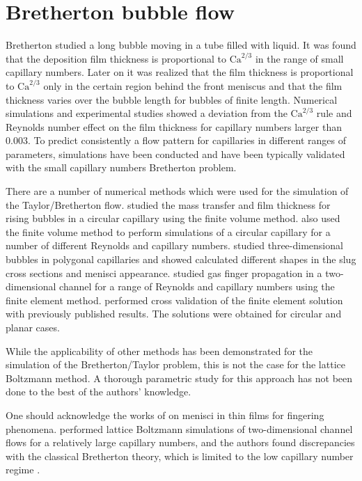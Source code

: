 \documentclass[preprint,12pt]{elsarticle}
\newcommand{\Ca}{\mathrm{Ca}}
\begin{document}
\section{Bretherton bubble flow}
Bretherton \cite{bretherton} studied a long bubble
moving in a tube filled with liquid. It was found that the deposition film thickness
is proportional to $\Ca^{2/3}$ in the range of small capillary numbers. Later on
it was realized \cite{wong-films,wong-pressure} that the film thickness
is proportional to $\Ca^{2/3}$ only in the certain region behind the front meniscus and
that the film thickness
varies over the bubble length for bubbles of finite length. Numerical
simulations \cite{giavedoni-numerical} and experimental studies
\cite{kreutzer-pressure-drop} showed a deviation from the $\Ca^{2/3}$ rule and Reynolds number 
effect on the film thickness for capillary numbers larger than $0.003$.
To  predict consistently a flow pattern for capillaries in
different ranges of parameters, simulations have been conducted and have been typically validated with the
small capillary numbers Bretherton problem.

There are a number of numerical methods which
were used for the simulation of the Taylor/Bretherton flow.
\citet{vanbaten-circular} studied the mass transfer and film
thickness for rising bubbles in a circular capillary using the finite volume method.
\citet{kreutzer-pressure-drop} also used the finite volume method to perform
simulations of a circular capillary for a number of different
Reynolds and capillary numbers. \citeauthor{wong-films} \cite{wong-films,wong-pressure} studied
three-dimensional bubbles in
polygonal capillaries and showed calculated different shapes in the
slug cross sections and menisci appearance.
\citet{heil-bretherton,ingham-plates} studied gas finger propagation in
a two-dimensional channel for a range of Reynolds and capillary
numbers using the finite element method. \citet{giavedoni-numerical} performed cross validation of the
finite element solution with previously published results.
The solutions were obtained for circular and planar cases.

While the applicability of other methods has been demonstrated for the
simulation of the Bretherton/Taylor problem, this is not the case for
the lattice Boltzmann method. A thorough parametric study for this approach
has not been done to the best of the authors' knowledge.

One should acknowledge the works of \citet{pagonabarraga-fingers} on menisci
in thin films for fingering phenomena. \citet{sehgal-microchannel} performed lattice Boltzmann
simulations of two-dimensional channel flows for a relatively large capillary numbers, and
the authors found discrepancies with the classical Bretherton theory, which
is limited to the low capillary number regime \cite{giavedoni-numerical}.
\end{document}
